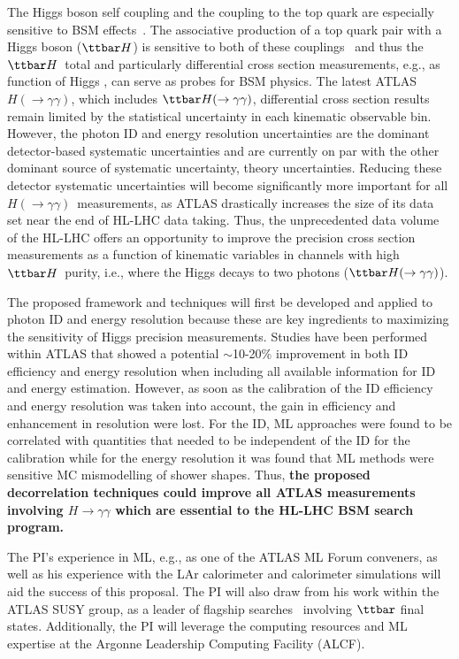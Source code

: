 \documentclass[letter, USenglish, 11pt, subfigure]{article}
\newcommand{\tth}{\ensuremath{\ttbar H}}
\newcommand{\tthyy}{\ensuremath{\ttbar H(\to\gamma\gamma)}}
\newcommand{\hyy}{\ensuremath{H(\to\gamma\gamma)}}
\begin{document}
The Higgs boson self coupling and the coupling to the top quark are especially sensitive to BSM effects~\cite{Agrawal_2020}. The associative production of a top quark pair with a Higgs boson (\tth) is sensitive to both of these couplings~\cite{Maltoni_2017} and thus the \tth\ total and particularly differential cross section measurements, e.g., as function of Higgs \pt, can serve as probes for BSM physics. The latest ATLAS \hyy, which includes \tthyy, differential cross section results~\cite{ATLAS_STXS} remain limited by the statistical uncertainty in each kinematic observable bin. However, the photon ID and energy resolution uncertainties are the dominant detector-based systematic uncertainties and are currently on par with the other dominant source of systematic uncertainty, theory uncertainties. Reducing these detector systematic uncertainties will become significantly more important for all \hyy\ measurements, as ATLAS drastically increases the size of its data set near the end of HL-LHC data taking. Thus, the unprecedented data volume of the HL-LHC offers an opportunity to improve the precision cross section measurements as a function of kinematic variables in channels with high \tth\ purity, i.e., where the Higgs decays to two photons (\tthyy).

The proposed framework and techniques will first be developed and applied to photon ID and energy resolution because these are key ingredients to maximizing the sensitivity of Higgs precision measurements. Studies have been performed within ATLAS that showed a potential $\sim$10-20\% improvement in both ID efficiency and energy resolution when including all available information for ID and energy estimation. However, as soon as the calibration of the ID efficiency and energy resolution was taken into account, the gain in efficiency and enhancement in resolution were lost. For the ID, ML approaches were found to be correlated with quantities that needed to be independent of the ID for the calibration while for the energy resolution it was found that ML methods were sensitive MC mismodelling of shower shapes. Thus, {\bf the proposed decorrelation techniques could improve all ATLAS measurements involving $H\to\gamma\gamma$ which are essential to the HL-LHC BSM search program.}

The PI's experience in ML, e.g., as one of the ATLAS ML Forum conveners, as well as his experience with the LAr calorimeter and calorimeter simulations will aid the success of this proposal. The PI will also draw from his work within the ATLAS SUSY group, as a leader of flagship searches~\cite{stop0L_1,stopRun1,stop0L_2,stop0L_3} involving $\ttbar$ final states. Additionally, the PI will leverage the computing resources and ML expertise at the Argonne Leadership Computing Facility (ALCF).
\end{document}
